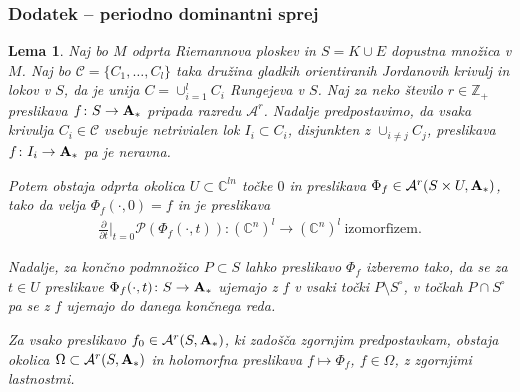 \documentclass[9pt, table]{beamer}
\newtheorem{lema}{Lema}
\newcommand{\Z}{\mathbb Z}
\newcommand{\C}{\mathbb C}
\begin{document}
\begin{frame}
\frametitle{Dodatek -- periodno dominantni sprej}
 
\begin{lema}
Naj bo $M$ odprta Riemannova ploskev in $S = K \cup E$ dopustna množica v $M$. Naj bo $\mathcal{C} = \{C_1, \dots , C_{l} \}$ taka družina gladkih orientiranih Jordanovih krivulj in lokov v $S$, da je unija $C = \cup_{i=1}^{l} C_{i}$ Rungejeva v $S$.
Naj za neko število $r \in \Z_{+}$ preslikava $f \colon S \to \textbf{\textup{A}}_{*}$ pripada razredu $\mathcal{A}^{r}$.
Nadalje predpostavimo, da vsaka krivulja $C_{i} \in \mathcal{C}$ vsebuje netrivialen lok $I_{i} \subset C_{i}$, disjunkten z $\cup_{i \neq j}C_{j}$, preslikava $f \colon I_{i} \to \textbf{\textup{A}}_{*}$ pa je neravna.

Potem obstaja odprta okolica $U \subset \C^{ln}$ točke $0$ in preslikava $\Phi_{f} \in \mathcal{A}^{r} (S \times U, \textbf{\textup{A}}_{*})$, tako da velja
$\Phi_{f}(\cdot, 0) = f$ in je preslikava
\begin{gather} \label{PD-lastnost}
	 \frac{\partial}{\partial t} \Big|_{t=0} \mathcal{P}(\Phi_{f}(\cdot, t)) \colon (\C^{n})^{l} \to (\C^{n})^{l} \ \text{izomorfizem.}
\end{gather}

Nadalje, za končno podmnožico $P \subset S$ lahko preslikavo $\Phi_{f}$ izberemo tako, da se za $t \in U$ preslikave $\Phi_{f}(\cdot, t) \colon S \to\textbf{\textup{A}}_{*}$ ujemajo z $f$ v vsaki točki $P \setminus S^\circ$, v točkah $P \cap S^\circ$ pa se z $f$ ujemajo do danega končnega reda.

Za vsako preslikavo $f_{0} \in \mathcal{A}^{r}(S, \textbf{\textup{A}}_{*})$, ki zadošča zgornjim predpostavkam, obstaja okolica $\Omega \subset \mathcal{A}^{r}(S, \textbf{\textup{A}}_{*})$ in holomorfna preslikava $f \mapsto \Phi_{f}$, $f \in \Omega$, z zgornjimi lastnostmi.
\end{lema}

\end{frame}

\end{document}

